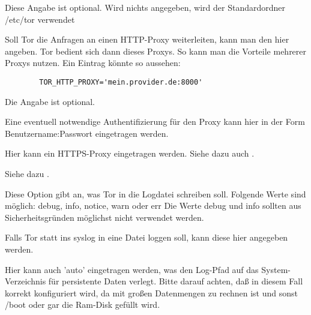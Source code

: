 \begin{description}

        Diese Angabe ist optional. Wird nichts angegeben, wird der
Standardordner
        /etc/tor verwendet


        {Soll Tor die Anfragen an einen HTTP-Proxy weiterleiten,
        kann man den hier angeben. Tor bedient sich dann dieses
        Proxys. So kann man die Vorteile mehrerer Proxys nutzen. Ein
        Eintrag könnte so aussehen:

\begin{example}
\begin{verbatim}
        TOR_HTTP_PROXY='mein.provider.de:8000'
\end{verbatim}
\end{example}
        Die Angabe ist optional.}


        Eine eventuell notwendige Authentifizierung für den Proxy kann
        hier in der Form Benutzername:Passwort eingetragen werden.


        Hier kann ein HTTPS-Proxy eingetragen werden. Siehe dazu auch
        .


        Siehe dazu .


        {Diese Option gibt an, was Tor in die Logdatei schreiben
        soll. Folgende Werte sind möglich:
        debug, info, notice, warn oder err
        Die Werte debug und info sollten aus Sicherheitsgründen möglichst
        nicht verwendet werden.}


        Falls Tor statt ins syslog in eine Datei loggen soll,
        kann diese hier angegeben werden.

        Hier kann auch 'auto' eingetragen werden, was den Log-Pfad auf
        das System-Verzeichnis für persistente Daten verlegt.
        Bitte darauf achten, daß in diesem Fall  korrekt
        konfiguriert wird, da mit großen Datenmengen zu rechnen ist und sonst
        /boot oder gar die Ram-Disk gefüllt wird.

\end{description}
